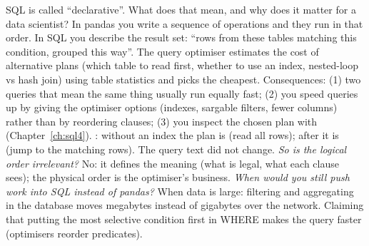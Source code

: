 \begin{qa}{\deep SQL is called ``declarative''. What does that mean, and why does it matter for a data scientist?}
\why In pandas you write a sequence of operations and they run in that order. In SQL you describe the result set: ``rows from these tables matching
this condition, grouped this way''. The query optimiser estimates the cost of alternative plans (which table to read first, whether to use an index,
nested-loop vs hash join) using table statistics and picks the cheapest. Consequences: (1) two queries that mean the same thing usually run equally fast;
(2) you speed queries up by giving the optimiser options (indexes, sargable filters, fewer columns) rather than by reordering clauses; (3) you inspect
the chosen plan with  (Chapter~\ref{ch:sql4}).
\worked {}: without an index the plan is  (read all rows); after
 it is  (jump to the matching rows). The query text did not change.
\pushes \emph{So is the logical order irrelevant?} No: it defines the meaning (what is legal, what each clause sees); the physical order is the
optimiser's business. \emph{When would you still push work into SQL instead of pandas?} When data is large: filtering and aggregating in the database
moves megabytes instead of gigabytes over the network.
\pitfall Claiming that putting the most selective condition first in WHERE makes the query faster (optimisers reorder predicates).
\end{qa}

